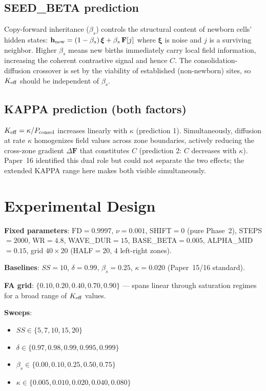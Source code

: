 \documentclass[11pt,a4paper]{article}
\begin{document}
\subsection{SEED\_BETA prediction}

Copy-forward inheritance ($\beta_s$) controls the structural content of newborn cells'
hidden states:
$\mathbf{h}_{\rm new} = (1-\beta_s)\,\boldsymbol{\xi} + \beta_s\,\mathbf{F}[j]$
where $\boldsymbol{\xi}$ is noise and $j$ is a surviving neighbor.
Higher $\beta_s$ means new births immediately carry local field information, increasing
the coherent contrastive signal and hence $C$.  The consolidation-diffusion crossover is
set by the viability of established (non-newborn) sites, so $K_{\rm eff}$ should be
independent of $\beta_s$.

\subsection{KAPPA prediction (both factors)}

$K_{\rm eff} = \kappa/P_{\rm consol}$ increases linearly with $\kappa$ (prediction 1).
Simultaneously, diffusion at rate $\kappa$ homogenizes field values across zone boundaries,
actively reducing the cross-zone gradient $\Delta\mathbf{F}$ that constitutes $C$
(prediction 2: $C$ decreases with $\kappa$).  Paper~16 identified this dual role
but could not separate the two effects; the extended KAPPA range here makes both
visible simultaneously.

\section{Experimental Design}

\textbf{Fixed parameters}: $\mathrm{FD}=0.9997$, $\nu=0.001$, SHIFT$=0$ (pure Phase~2),
STEPS$=2000$, WR$=4.8$, WAVE\_DUR$=15$, BASE\_BETA$=0.005$, ALPHA\_MID$=0.15$,
grid $40\times20$ (HALF$=20$, 4 left-right zones).

\textbf{Baselines}: $SS=10$, $\delta=0.99$, $\beta_s=0.25$, $\kappa=0.020$
(Paper~15/16 standard).

\textbf{FA grid}: $\{0.10, 0.20, 0.40, 0.70, 0.90\}$ --- spans linear through
saturation regimes for a broad range of $K_{\rm eff}$ values.

\textbf{Sweeps}:
\begin{itemize}
\item $SS \in \{5, 7, 10, 15, 20\}$
\item $\delta \in \{0.97, 0.98, 0.99, 0.995, 0.999\}$
\item $\beta_s \in \{0.00, 0.10, 0.25, 0.50, 0.75\}$
\item $\kappa \in \{0.005, 0.010, 0.020, 0.040, 0.080\}$
\end{itemize}
\end{document}
